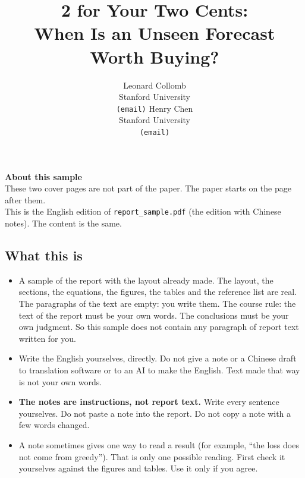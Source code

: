 \documentclass{article}
\title{2\textcent{} for Your Two Cents:\\ When Is an Unseen Forecast Worth Buying?}
\author{%
  Leonard Collomb\\ Stanford University\\ \texttt{(email)}
  \And
  Henry Chen\\ Stanford University\\ \texttt{(email)}}
\newif\ifnotes
\newenvironment{pts}{\begin{itemize}[nosep,leftmargin=1.15em,topsep=1pt]}{\end{itemize}}
\begin{document}
\ifnotes
\pagestyle{empty}
\begingroup\small
\begin{center}
{\Large\bfseries About this sample}\\[3pt]
{\small These two cover pages are not part of the paper. The paper starts on the page after them.\\
This is the English edition of \texttt{report\_sample.pdf} (the edition with Chinese notes). The content is the same.}
\end{center}

\subsection*{What this is}
\begin{pts}
\item A sample of the report with the layout already made. The layout, the sections, the equations, the figures, the tables and the reference list are real. The paragraphs of the text are empty: you write them. The course rule: the text of the report must be your own words. The conclusions must be your own judgment. So this sample does not contain any paragraph of report text written for you.
\item Write the English yourselves, directly. Do not give a note or a Chinese draft to translation software or to an AI to make the English. Text made that way is not your own words.
\item \textbf{The notes are instructions, not report text.} Write every sentence yourselves. Do not paste a note into the report. Do not copy a note with a few words changed.
\item A note sometimes gives one way to read a result (for example, ``the loss does not come from greedy''). That is only one possible reading. First check it yourselves against the figures and tables. Use it only if you agree.
\end{pts}
\end{document}
